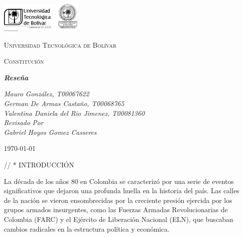 \documentclass[letterpaper, 12pt]{article}
\begin{document}
\begin{titlepage}
	\centering
	\includegraphics[width=0.3\textwidth]{Images/logo_utb.png}\par\vspace{1cm}
	{\scshape\LARGE Universidad Tecnológica de Bolívar \par}
	\vspace{1cm}

	{\scshape\Large Constitución \par}
	\vspace{.2cm}

	\vspace{3cm}
	\slshape {\Large \bfseries{} Reseña   \\}
	\vspace{2cm}

	\slshape {\itshape{} Mauro González, T00067622 \\}
	\slshape {\itshape{} German De Armas Castaño, T00068765 \\}
	\slshape {\itshape{} Valentina Daniela del Rio Jimenez, T00081360 \\}
	\vfill
	Revisado Por \\
	Gabriel Hoyos Gomez Casseres\\
	{\large \today\par}
\end{titlepage}


// * INTRODUCCIÓN

La década de los años 80 en Colombia se caracterizó por una
serie de eventos significativos que dejaron una profunda
huella en la historia del país. Las calles de la nación se
vieron ensombrecidas por la creciente presión ejercida por
los grupos armados insurgentes, como las Fuerzas Armadas
Revolucionarias de Colombia (FARC) y el Ejército de
Liberación Nacional (ELN), que buscaban cambios radicales
en la estructura política y económica.
\end{document}
